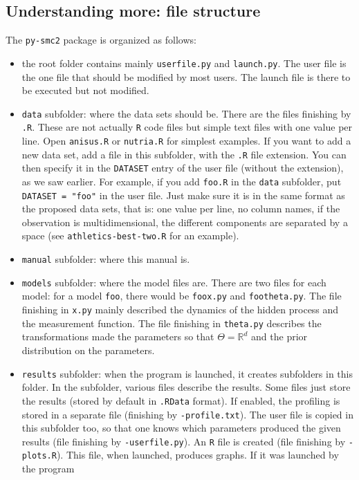 \documentclass[a4paper,10pt]{paper}
\newcommand{\pysmc}{\texttt{py-smc2}\xspace}
\begin{document}
\subsection{Understanding more: file structure}

The \pysmc package is organized as follows:
\begin{itemize}
 \item the root folder contains mainly \texttt{userfile.py} and \texttt{launch.py}. The user file is the one file that should be modified by most users.
The launch file is there to be executed but not modified.
 \item \texttt{data} subfolder: where the data sets should be. There are the files finishing by \texttt{.R}. These are not actually \texttt{R} code files
but simple text files with one value per line. Open \texttt{anisus.R} or \texttt{nutria.R} for simplest examples. If you want to add a new data set,
add a file in this subfolder, with the \texttt{.R} file extension. You can then specify it in the \texttt{DATASET} entry of the user file (without the extension), as we saw earlier. For example, if you add \texttt{foo.R} in the \texttt{data} subfolder, put \texttt{DATASET = "foo"} in the user file. Just make sure it is in the
same format as the proposed data sets, that is: one value per line, no column names, if the observation is multidimensional, the different components are separated by a space (see \texttt{athletics-best-two.R} for an example).
 \item \texttt{manual} subfolder: where this manual is.
 \item \texttt{models} subfolder: where the model files are. There are two files for each model: for a model \texttt{foo}, there would be \texttt{foox.py} and 
\texttt{footheta.py}. The file finishing in \texttt{x.py} mainly described the dynamics of the hidden process and the measurement function. The file finishing
in \texttt{theta.py} describes the transformations made the parameters so that $\Theta = \mathbb{R}^d$ and the prior distribution on the parameters.
 \item \texttt{results} subfolder: when the program is launched, it creates subfolders in this folder. In the subfolder, various files describe the results.
 Some files just store the results (stored by default in \texttt{.RData} format). If enabled, the profiling is stored in a separate file (finishing by \texttt{-profile.txt}). The user file is copied in this subfolder too, so that one knows which parameters produced the given results (file finishing by \texttt{-userfile.py}). An \texttt{R} file is created (file finishing by \texttt{-plots.R}). This file, when launched, produces graphs. If it was launched by the program

\end{itemize}
\end{document}
